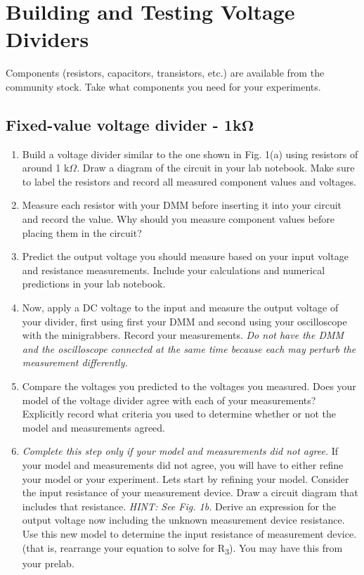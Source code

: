 \documentclass[10pt]{PhysLab1C} %
\begin{document}

\section{Building and Testing Voltage Dividers}

Components (resistors, capacitors, transistors, etc.) are
available from the community stock. Take what components you need for your experiments.

\subsection{Fixed-value voltage divider - 1k\texorpdfstring{$\boldsymbol{\Omega}$}{ohm}}

\begin{enumerate}
\def\labelenumi{\arabic{enumi}.}
\item
  Build a voltage divider similar to the one shown in Fig. 1(a) using
  resistors of around 1 k$\Omega$. Draw a diagram of the circuit in your lab
  notebook. Make sure to label the resistors and record all measured
  component values and voltages.
\item
  Measure each resistor with your DMM before inserting it into your
  circuit and record the value. Why should you measure component values
  before placing them in the circuit?
\item
  Predict the output voltage you should measure based on your input
  voltage and resistance measurements. Include your calculations and
  numerical predictions in your lab notebook.
\item
  Now, apply a DC voltage to the input and measure the output voltage of
  your divider, first using first your DMM and second using your
  oscilloscope with the minigrabbers. Record your measurements. \emph{Do
  not have the DMM and the oscilloscope connected at the same time
  because each may perturb the measurement differently.}
\item
  Compare the voltages you predicted to the voltages you measured. Does
  your model of the voltage divider agree with each of your
  measurements? Explicitly record what criteria you used to determine
  whether or not the model and measurements agreed.
\item
  \emph{Complete this step only if your model and measurements did not
  agree.} If your model and measurements did not agree, you will have to
  either refine your model or your experiment. Let\textquotesingle s
  start by refining your model. Consider the input resistance of your
  measurement device. Draw a circuit diagram that includes that
  resistance. \emph{HINT: See Fig. 1b.} Derive an expression for the
  output voltage now including the unknown measurement device
  resistance. Use this new model to determine the input resistance of
  measurement device. (that is, rearrange your equation to solve for
  R\textsubscript{3}). You may have this from your prelab.
\end{enumerate}
\end{document}
